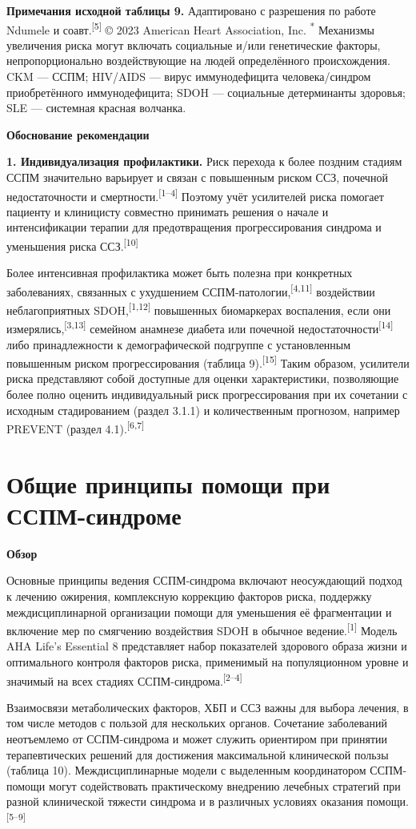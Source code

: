 \documentclass[11pt,a4paper]{article}
\newcommand{\src}[1]{\textsuperscript{[#1]}}
\newcommand{\heading}[1]{\par\medskip\textbf{#1}\par}
\begin{document}
\textbf{Примечания исходной таблицы 9.} Адаптировано с разрешения по работе Ndumele и соавт.\src{5} © 2023 American Heart Association, Inc. \textsuperscript{*} Механизмы увеличения риска могут включать социальные и/или генетические факторы, непропорционально воздействующие на людей определённого происхождения. CKM --- ССПМ; HIV/AIDS --- вирус иммунодефицита человека/синдром приобретённого иммунодефицита; SDOH --- социальные детерминанты здоровья; SLE --- системная красная волчанка.

\heading{Обоснование рекомендации}
\textbf{1. Индивидуализация профилактики.} Риск перехода к более поздним стадиям ССПМ значительно варьирует и связан с повышенным риском ССЗ, почечной недостаточности и смертности.\src{1--4} Поэтому учёт усилителей риска помогает пациенту и клиницисту совместно принимать решения о начале и интенсификации терапии для предотвращения прогрессирования синдрома и уменьшения риска ССЗ.\src{10}

Более интенсивная профилактика может быть полезна при конкретных заболеваниях, связанных с ухудшением ССПМ-патологии,\src{4,11} воздействии неблагоприятных SDOH,\src{1,12} повышенных биомаркерах воспаления, если они измерялись,\src{3,13} семейном анамнезе диабета или почечной недостаточности\src{14} либо принадлежности к демографической подгруппе с установленным повышенным риском прогрессирования (таблица 9).\src{15} Таким образом, усилители риска представляют собой доступные для оценки характеристики, позволяющие более полно оценить индивидуальный риск прогрессирования при их сочетании с исходным стадированием (раздел 3.1.1) и количественным прогнозом, например PREVENT (раздел 4.1).\src{6,7}


\section{Общие принципы помощи при ССПМ-синдроме}
\heading{Обзор}
Основные принципы ведения ССПМ-синдрома включают неосуждающий подход к лечению ожирения, комплексную коррекцию факторов риска, поддержку междисциплинарной организации помощи для уменьшения её фрагментации и включение мер по смягчению воздействия SDOH в обычное ведение.\src{1} Модель AHA Life's Essential 8 представляет набор показателей здорового образа жизни и оптимального контроля факторов риска, применимый на популяционном уровне и значимый на всех стадиях ССПМ-синдрома.\src{2--4}

Взаимосвязи метаболических факторов, ХБП и ССЗ важны для выбора лечения, в том числе методов с пользой для нескольких органов. Сочетание заболеваний неотъемлемо от ССПМ-синдрома и может служить ориентиром при принятии терапевтических решений для достижения максимальной клинической пользы (таблица 10). Междисциплинарные модели с выделенным координатором ССПМ-помощи могут содействовать практическому внедрению лечебных стратегий при разной клинической тяжести синдрома и в различных условиях оказания помощи.\src{5--9}
\end{document}
